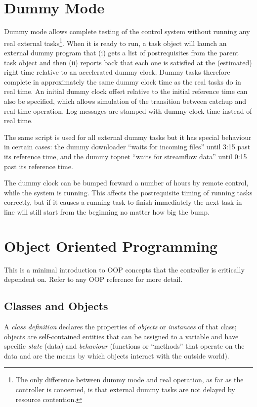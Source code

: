 \documentclass[a4paper,12pt]{amsart}
\begin{document}
\appendix

\section{Dummy Mode}

Dummy mode allows complete testing of the control system without running
any real external tasks\footnote{The only difference between dummy mode
and real operation, as far as the controller is concerned, is that
external dummy tasks are not delayed by resource contention.}. When it
is ready to run, a task object will launch an external dummy program
that (i) gets a list of postrequisites from the parent task object and
then (ii) reports back that each one is satisfied at the (estimated)
right time relative to an accelerated dummy clock. Dummy tasks therefore
complete in approximately the same dummy clock time as the real tasks do
in real time. An initial dummy clock offset relative to the initial
reference time can also be specified, which allows simulation of the
transition between catchup and real time operation. Log messages are
stamped with dummy clock time instead of real time.

The same script is used for all external dummy tasks but it has special
behaviour in certain cases: the dummy downloader ``waits for incoming
files'' until 3:15 past its reference time, and the dummy topnet ``waits
for streamflow data'' until 0:15 past its reference time.

The dummy clock can be bumped forward a number of hours by remote
control, while the system is running. This affects the postrequisite
timing of running tasks correctly, but if it causes a running task to
finish immediately the next task in line will still start from the
beginning no matter how big the bump.


\section{Object Oriented Programming}

This is a minimal introduction to OOP concepts that the controller is
critically dependent on. Refer to any OOP reference for more detail.

\subsection{Classes and Objects}

A {\em class definition} declares the properties of {\em objects} or
{\em instances} of that class; objects are self-contained entities that
can be assigned to a variable and have specific {\em state} (data) and
{\em behaviour} (functions or ``methods'' that operate on the data and
are the means by which objects interact with the outside world).    
\end{document}

